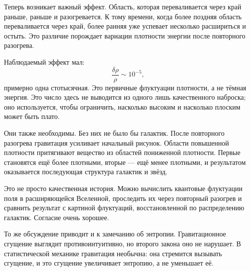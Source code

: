 Теперь возникает важный эффект. Область, которая переваливается через край раньше, раньше и разогревается. К тому времени, когда более поздняя область переваливается через край, более ранняя уже успевает несколько расшириться и остыть. Это различие порождает вариации плотности энергии после повторного разогрева.

\begin{classroomqa}
\end{classroomqa}

Наблюдаемый эффект мал:
\begin{equation}
\frac{\delta\rho}{\rho}\sim 10^{-5},
\end{equation}
примерно одна стотысячная. Это первичные флуктуации плотности, а не тёмная энергия. Это число здесь не выводится из одного лишь качественного наброска; оно используется, чтобы ограничить, насколько высоким и насколько плоским может быть плато.

Они также необходимы. Без них не было бы галактик. После повторного разогрева гравитация усиливает начальный рисунок. Области повышенной плотности притягивают вещество из областей пониженной плотности. Первые становятся ещё более плотными, вторые — ещё менее плотными, и результатом оказывается последующая структура галактик и звёзд.

Это не просто качественная история. Можно вычислить квантовые флуктуации поля в расширяющейся Вселенной, проследить их через повторный разогрев и сравнить результат с картиной флуктуаций, восстановленной по распределению галактик. Согласие очень хорошее.

То же обсуждение приводит и к замечанию об энтропии. Гравитационное сгущение выглядит противоинтуитивно, но второго закона оно не нарушает. В статистической механике гравитация необычна: она стремится вызывать сгущение, и это сгущение увеличивает энтропию, а не уменьшает её.

\begin{classroomqa}
\end{classroomqa}

